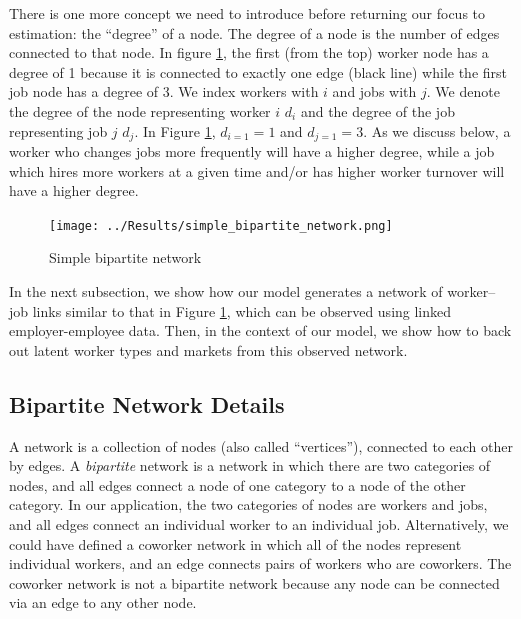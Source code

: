 \documentclass[12pt]{article}
\theoremstyle{definition}
\theoremstyle{plain}
\begin{document}
There is one more concept we need to introduce before returning our focus to estimation: the ``degree'' of a node. The degree of a node is the number of edges connected to that node. In figure  \ref{fig:simple_bipartite_network}, the first (from the top) worker node has a degree of 1 because it is connected to exactly one edge (black line) while the first job node has a degree of 3. We index workers with $i$ and jobs with $j$. We denote the degree of the node representing worker $i$ $d_i$ and the degree of the job representing job $j$ $d_j$. In Figure \ref{fig:simple_bipartite_network}, $d_{i=1}=1$ and $d_{j=1}=3$. As we discuss below, a worker who changes jobs more frequently will have a higher degree, while a job which hires more  workers at a given time and/or has higher worker turnover will have a higher degree. 

\begin{figure}[!htbp]
	\caption{Simple bipartite network}
	\centering
	\texttt{[image: ../Results/simple\_bipartite\_network.png]}
	\label{fig:simple_bipartite_network}
\end{figure}

In the next subsection, we show how our model generates a network of worker--job links similar to that in Figure \ref{fig:simple_bipartite_network}, which can be observed using linked employer-employee data.  Then, in the context of our model, we show how to back out latent worker types and markets from this observed network. 



\subsection{Bipartite Network Details}

\label{sec:bipartite_network_details}

A network is a collection of nodes (also called ``vertices''), connected to each other by edges. A \emph{bipartite} network is a network in which there are two categories of nodes, and all edges connect a node of one category to a node of the other category. In our application, the two categories of nodes are workers and jobs, and all edges connect an individual worker to an individual job. Alternatively, we could have defined a coworker network in which all of the nodes represent individual workers, and an edge connects pairs of workers who are coworkers. The coworker network is not a bipartite network because any node can be connected via an edge to any other node. 
\end{document}

